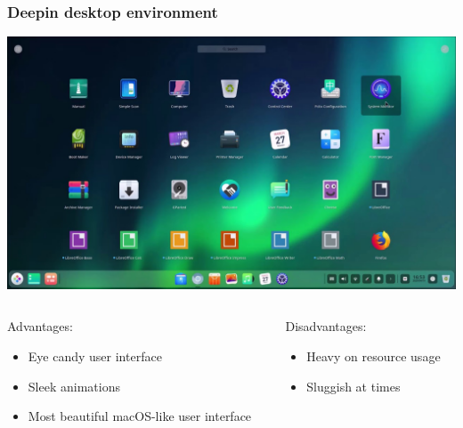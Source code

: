 \begin{frame}
	\frametitle{Deepin desktop environment}
	
	\begin{center}
		\includegraphics[width=.7\linewidth]{../graphics/desktop_examples/deepin.jpg}
	\end{center}%
	
	\vspace{-\baselineskip}
	
	\begin{columns}
		\begin{column}[t]{.7\linewidth}
			\begin{exampleblock}{Advantages:}
				\begin{itemize}
					\item Eye candy user interface
					\item Sleek animations
					\item Most beautiful macOS-like user interface
				\end{itemize}
			\end{exampleblock}
		\end{column}
		\hfill
		\begin{column}[t]{.28\linewidth}
			\begin{alertblock}{Disadvantages:}
				\begin{itemize}
					\item Heavy on resource usage 
					\item Sluggish at times
				\end{itemize}
			\end{alertblock}
		\end{column}
	\end{columns}
	\hfill
\end{frame}
